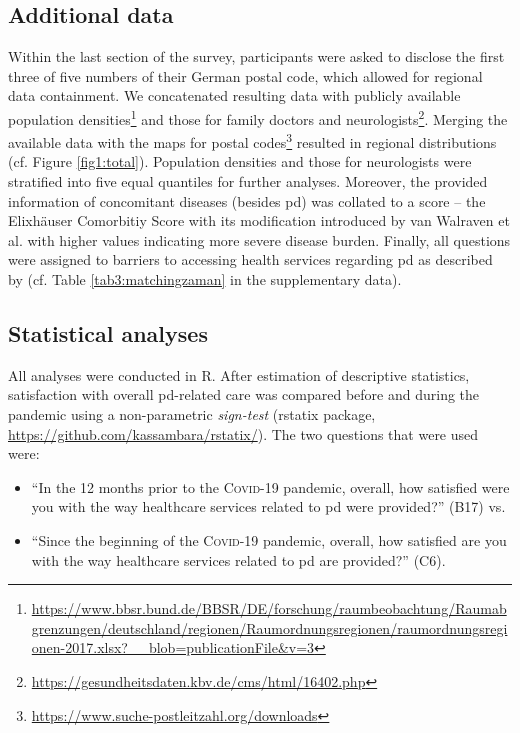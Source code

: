 \documentclass{bmcart}
\begin{document}
\subsection*{Additional data}
Within the last section of the survey, participants were asked to disclose the first three of five numbers of their German postal code, which allowed for regional data containment. We concatenated resulting data with publicly available population densities\footnote{\url{https://www.bbsr.bund.de/BBSR/DE/forschung/raumbeobachtung/Raumabgrenzungen/deutschland/regionen/Raumordnungsregionen/raumordnungsregionen-2017.xlsx?\_\_blob=publicationFile\&v=3}} and those for family doctors and neurologists\footnote{\url{https://gesundheitsdaten.kbv.de/cms/html/16402.php}}. Merging the available data with the maps for postal codes\footnote{\url{https://www.suche-postleitzahl.org/downloads}} resulted in regional distributions  (cf. Figure \ref{fig1:total}). Population densities and those for neurologists were stratified into five equal quantiles for further analyses. Moreover, the provided information of concomitant diseases (besides \ac{pd}) was collated to a score -- the Elixhäuser Comorbitiy Score with its modification introduced by van Walraven et al. \cite{van2009modification} with higher values indicating more severe disease burden. Finally, all questions were assigned to barriers to accessing health services regarding \ac{pd} as described by \cite{zaman2021barriers} (cf. Table \ref{tab3:matchingzaman} in the supplementary data).

\subsection*{Statistical analyses}
All analyses were conducted in R\cite{rcore}. After estimation of descriptive statistics, satisfaction with overall \ac{pd}-related care was compared before and during the pandemic using a non-parametric \textit{sign-test} (rstatix package, \url{https://github.com/kassambara/rstatix/}). The two questions that were used were: 
\begin{itemize}
\item ``In the 12 months prior to the  \textsc{Covid}-19 pandemic, overall, how satisfied were you with the way healthcare services related to \acl{pd} were provided?'' (B17) vs.
\item ``Since the beginning of the \textsc{Covid}-19 pandemic, overall, how satisfied are you with the way healthcare services related to \acl{pd} are provided?'' (C6).
\end{itemize}
\end{document}
